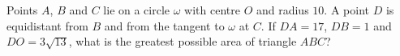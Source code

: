 Points $A$, $B$ and $C$ lie on a circle $\omega$ with centre $O$ and radius $10$. A point $D$ is equidistant from $B$ and from the tangent to $\omega$ at $C$. If $DA=17$, $DB=1$ and $DO=3\sqrt{13}$, what is the greatest possible area of triangle $ABC$?
